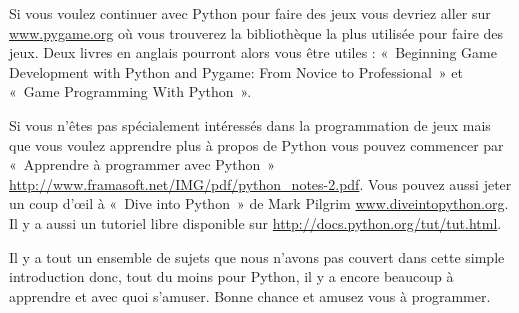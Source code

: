 Si vous voulez continuer avec Python pour faire des jeux vous devriez aller sur \url{www.pygame.org} où vous trouverez la bibliothèque la plus utilisée pour faire des jeux. Deux livres en anglais pourront alors vous être utiles : « Beginning Game Development with Python and Pygame: From Novice to Professional » et « Game Programming With Python ».


Si vous n'êtes pas spécialement intéressés dans la programmation de jeux mais que vous voulez apprendre plus à propos de Python vous pouvez commencer par « Apprendre à programmer avec Python » \url{http://www.framasoft.net/IMG/pdf/python_notes-2.pdf}. Vous pouvez aussi jeter un coup d'œil à « Dive into Python » de Mark Pilgrim \url{www.diveintopython.org}. Il y a aussi un tutoriel libre disponible sur \url{http://docs.python.org/tut/tut.html}.

Il y a tout un ensemble de sujets que nous n'avons pas couvert dans cette simple introduction donc, tout du moins pour Python, il y a encore beaucoup à apprendre et avec quoi s'amuser. Bonne chance et amusez vous à programmer.
 
